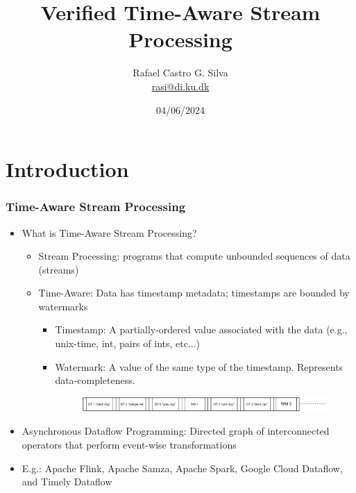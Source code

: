 \documentclass[aspectratio=169,10pt]{beamer}
\title[Verified Time-Aware Stream Processing]{Verified Time-Aware Stream Processing}
\author[Rafael Castro]{
  Rafael Castro G. Silva\\\medskip
  {\small \url{rasi@di.ku.dk}}}
\date{04/06/2024}
\institute[UCPH]{
  Department of Computer Science \\
  University of Copenhagen}
\begin{document}

\begin{frame}
  \titlepage

\end{frame}
\section{Introduction}

\begin{frame}[fragile]
  \frametitle{Time-Aware Stream Processing}
  \begin{itemize}
    \item What is Time-Aware Stream Processing?
          \begin{itemize}
                  \pause
            \item Stream Processing: programs that compute unbounded sequences of data (streams)
                  \pause
            \item Time-Aware: Data has timestamp metadata; timestamps are bounded by watermarks
                  \begin{itemize}
                    \item Timestamp: A partially-ordered value associated with the data (e.g., unix-time, int, pairs of ints, etc...)
                    \item Watermark: A value of the same type of the timestamp. Represents data-completeness.
                          \begin{figure}
                            \centering
                            \includegraphics[width=.75\textwidth]{stream_ex1.pdf}
                          \end{figure}
                  \end{itemize}
          \end{itemize}
          \pause
    \item Asynchronous Dataflow Programming: Directed graph of interconnected operators that perform event-wise transformations
    \item E.g.: Apache Flink, Apache Samza, Apache Spark, Google Cloud Dataflow, and Timely Dataflow
          \vspace*{-1ex}
          \begin{overlayarea}{\textwidth}{.1\textheight}
            \centering
            \begin{figure}

\end{figure}
\end{overlayarea}
\end{itemize}
\end{frame}
\end{document}
